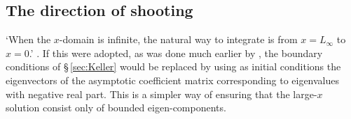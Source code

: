 \documentclass{article}
\begin{document}
\subsection{The direction of shooting}

`When the $x$-domain is infinite, the natural way to integrate is from
$x=L_\infty$ to $x=0$.' \citep[at p.~208]{Allen02:NM-92-197}.  If this
were adopted, as was done much earlier by \citet{Mack76:JFM-73-497}, the
boundary conditions of \S\,\ref{sec:Keller} would be replaced by using
as initial conditions the eigenvectors of the asymptotic coefficient
matrix corresponding to eigenvalues with negative real part.  This is
a simpler way of ensuring that the large-$x$ solution consist only of
bounded eigen-components.

 
\end{document}
